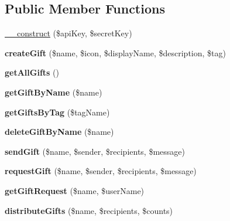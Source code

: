 \subsection*{Public Member Functions}
\begin{DoxyCompactItemize}
\item 
\hyperlink{class_gift_service_a49f2ad222e06420736d750e167d55d7c}{\+\_\+\+\_\+construct} (\$api\+Key, \$secret\+Key)
\item 
\hypertarget{class_gift_service_ac1846abc1865436dbeef588a2c2e7876}{{\bfseries create\+Gift} (\$name, \$icon, \$display\+Name, \$description, \$tag)}\label{class_gift_service_ac1846abc1865436dbeef588a2c2e7876}

\item 
\hypertarget{class_gift_service_a0b7195ab1b56b322465a77b4362c07a6}{{\bfseries get\+All\+Gifts} ()}\label{class_gift_service_a0b7195ab1b56b322465a77b4362c07a6}

\item 
\hypertarget{class_gift_service_a14645082930116a4db72c7044f3c46ee}{{\bfseries get\+Gift\+By\+Name} (\$name)}\label{class_gift_service_a14645082930116a4db72c7044f3c46ee}

\item 
\hypertarget{class_gift_service_a967b434a8db545a12d36c7ea6fbed3a0}{{\bfseries get\+Gifts\+By\+Tag} (\$tag\+Name)}\label{class_gift_service_a967b434a8db545a12d36c7ea6fbed3a0}

\item 
\hypertarget{class_gift_service_a9df8aa9e293e80983704c8cb9bf33a8d}{{\bfseries delete\+Gift\+By\+Name} (\$name)}\label{class_gift_service_a9df8aa9e293e80983704c8cb9bf33a8d}

\item 
\hypertarget{class_gift_service_a4bcbc51656b3c610b9f8ff5829775f1f}{{\bfseries send\+Gift} (\$name, \$sender, \$recipients, \$message)}\label{class_gift_service_a4bcbc51656b3c610b9f8ff5829775f1f}

\item 
\hypertarget{class_gift_service_a6570966fe4664f7b5bd91e11ef51814f}{{\bfseries request\+Gift} (\$name, \$sender, \$recipients, \$message)}\label{class_gift_service_a6570966fe4664f7b5bd91e11ef51814f}

\item 
\hypertarget{class_gift_service_a83a5e0a063dfce0a88d45df6cf5f2f29}{{\bfseries get\+Gift\+Request} (\$name, \$user\+Name)}\label{class_gift_service_a83a5e0a063dfce0a88d45df6cf5f2f29}

\item 
\hypertarget{class_gift_service_a33550b3176426a76bad846f6d4ccb2a1}{{\bfseries distribute\+Gifts} (\$name, \$recipients, \$counts)}\label{class_gift_service_a33550b3176426a76bad846f6d4ccb2a1}


\end{DoxyCompactItemize}
